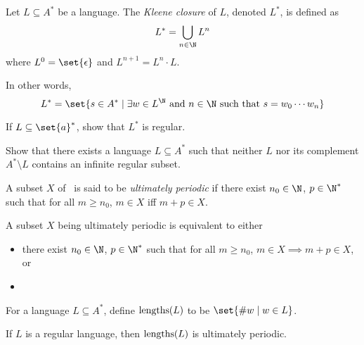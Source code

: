 
\begin{definition}
    Let $L \subseteq A^*$ be a language.
    The \emph{Kleene closure} of $L$, denoted $L^*$, is defined as \[
        L^* = \bigcup_{n \in \N} L^n
    \] where $L^0 = \set{\epsilon}$ and $L^{n+1} = L^n \cdot L$.
\end{definition}
In other words, \[
    L^* = \set{s \in A^* \mid \exists w \in L^\N \text{ and }
        n \in \N \text{ such that } s = w_0 \cdots w_n}
\]
\begin{problem}
    If $L \subseteq \set{a}^*$, show that $L^*$ is regular.
\end{problem}
\begin{problem}
    Show that there exists a language $L \subseteq A^*$ such that neither
    $L$ nor its complement $A^* \setminus L$ contains an infinite regular
    subset.
\end{problem}

\begin{definition} \label{def:ultimate_periodicity}
    A subset $X$ of \N\ is said to be \emph{ultimately periodic} if there
    exist $n_0 \in \N$, $p \in \N^*$ such that for all $m \ge n_0$,
    $m \in X$ iff $m + p \in X$.
\end{definition}
\begin{proposition}
    A subset $X$ being ultimately periodic is equivalent to either
    \begin{itemize}
        \item there exist $n_0 \in \N$, $p \in \N^*$ such that for all
            $m \ge n_0$, $m \in X \implies m + p \in X$, or
        \item 
    \end{itemize}
\end{proposition}

\begin{definition}
    For a language $L \subseteq A^*$, define $\operatorname{lengths}(L)$ to be
    $\set{\size w \mid w \in L}$.
\end{definition}
\begin{theorem}
    If $L$ is a regular language, then $\operatorname{lengths}(L)$ is ultimately periodic.
\end{theorem}
